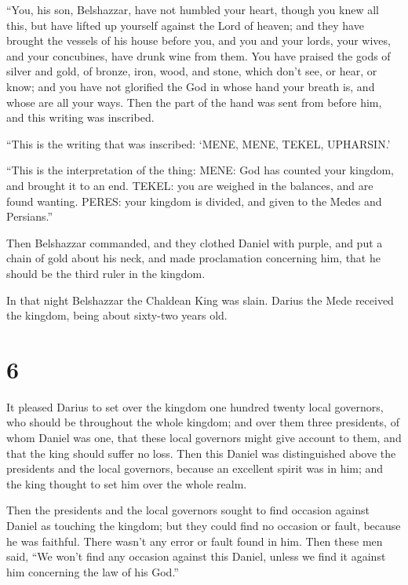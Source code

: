  ``You, his son, Belshazzar, have not humbled your heart,
though you knew all this,  but have lifted up yourself
against the Lord of heaven; and they have brought the vessels of his
house before you, and you and your lords, your wives, and your
concubines, have drunk wine from them. You have praised the gods of
silver and gold, of bronze, iron, wood, and stone, which don't see, or
hear, or know; and you have not glorified the God in whose hand your
breath is, and whose are all your ways.  Then the part of
the hand was sent from before him, and this writing was inscribed.

 ``This is the writing that was inscribed: `MENE, MENE,
TEKEL, UPHARSIN.'

 ``This is the interpretation of the thing: MENE: God has
counted your kingdom, and brought it to an end.  TEKEL:
you are weighed in the balances, and are found wanting. 
PERES: your kingdom is divided, and given to the Medes and Persians.''

 Then Belshazzar commanded, and they clothed Daniel with
purple, and put a chain of gold about his neck, and made proclamation
concerning him, that he should be the third ruler in the kingdom.

 In that night Belshazzar the Chaldean King was slain.
 Darius the Mede received the kingdom, being about
sixty-two years old.

\hypertarget{section-5}{%
\section{6}\label{section-5}}

 It pleased Darius to set over the kingdom one hundred
twenty local governors, who should be throughout the whole kingdom;
 and over them three presidents, of whom Daniel was one,
that these local governors might give account to them, and that the king
should suffer no loss.  Then this Daniel was distinguished
above the presidents and the local governors, because an excellent
spirit was in him; and the king thought to set him over the whole realm.

 Then the presidents and the local governors sought to
find occasion against Daniel as touching the kingdom; but they could
find no occasion or fault, because he was faithful. There wasn't any
error or fault found in him.  Then these men said, ``We
won't find any occasion against this Daniel, unless we find it against
him concerning the law of his God.''

